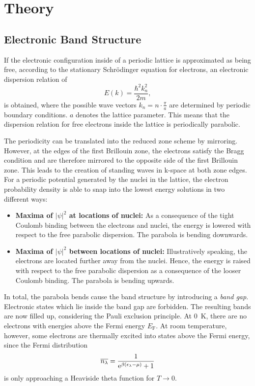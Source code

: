 \chapter{Theory}
\section{Electronic Band Structure}
If the electronic configuration inside of a periodic lattice is approximated as being free, according to the stationary Schrödinger equation for electrons, an electronic dispersion relation of
\begin{equation*}
	E(k) = \frac{\hbar^2 k_n^2}{2m},
\end{equation*}
is obtained, where the possible wave vectors $k_n = n\cdot\frac{\pi}{a}$ are determined by periodic boundary conditions.
$a$ denotes the lattice parameter.
This means that the dispersion relation for free electrons inside the lattice is periodically parabolic.

The periodicity can be translated into the reduced zone scheme by mirroring.
However, at the edges of the first Brillouin zone, the electrons satisfy the Bragg condition and are therefore mirrored to the opposite side of the first Brillouin zone.
This leads to the creation of standing waves in k-space at both zone edges.
For a periodic potential generated by the nuclei in the lattice, the electron probability density is able to snap into the lowest energy solutions in two different ways:
\begin{itemize}
\item \textbf{Maxima of $|\psi|^2$ at locations of nuclei:} As a consequence of the tight Coulomb binding between the electrons and nuclei, the energy is lowered with respect to the free parabolic dispersion. The parabola is bending downwards.
	\item \textbf{Maxima of $|\psi|^2$ between locations of nuclei:} Illustratively speaking, the electrons are located further away from the nuclei. Hence, the energy is raised with respect to the free parabolic dispersion as a consequence of the looser Coulomb binding. The parabola is bending upwards.
\end{itemize}

In total, the parabola bends cause the band structure by introducing a \textit{band gap}.
Electronic states which lie inside the band gap are forbidden.
The resulting bands are now filled up, considering the Pauli exclusion principle.
At \SI{0}{\kelvin}, there are no electrons with energies above the Fermi energy $E_\text{F}$.
At room temperature, however, some electrons are thermally excited into states above the Fermi energy, since the Fermi distribution
\begin{equation*}
  \overline{n_\lambda} = \frac{1}{\mathrm{e}^{\beta\left(\epsilon_\lambda-\mu\right)} + 1}
\end{equation*}
is only approaching a Heaviside theta function for $T\rightarrow 0$.

